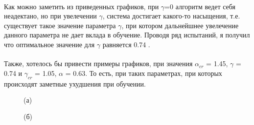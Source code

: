 \documentclass[a4paper]{report}
\theoremstyle{definition}
\theoremstyle{plain}
\theoremstyle{remark}
\theoremstyle{remark}
\theoremstyle{definition}
\begin{document}
\\
Как можно заметить из приведенных графиков, при $\gamma$=0 алгоритм ведет себя неадектано, но при увелечении $\gamma$, система достигает какого-то насыщения, т.е. существует такое значение параметра $\gamma$, при котором дальнейшнее увелечение данного параметра не дает вклада в обучение. Проводя ряд испытаний, я получил что оптимальное значение для $\gamma$ равняется 0.74 .
\\
\\
Также, хотелось бы привести примеры графиков, при значения $\alpha_{cr}$ = 1.45, $\gamma$ = 0.74 и $\gamma_{cr}$ = 1.05, $\alpha$ = 0.63. То есть, при таких параметрах, при которых происходят заметные ухудшения при обучении.
\begin{figure}[H]
    \begin{minipage}[H]{0.49\linewidth}
        (а)\\
    \end{minipage}
    \hfill
    \begin{minipage}[H]{0.49\linewidth}
        (б)\\

\end{minipage}
\end{figure}
\end{document}
